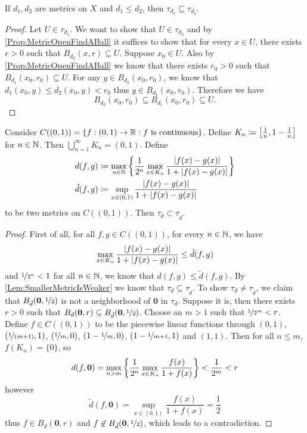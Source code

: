 \documentclass[screen]{techreport}
\numberwithin{equation}{section}
\begin{document}
\begin{lemma}\label{Lem:SmallerMetricIsWeaker}
	If $d_1,d_2$ are metrics on $X$ and $d_1 \le d_2$, then $\tau_{d_1} \subseteq \tau_{d_2}$.
\end{lemma}
\begin{proof}
	Let $U \in \tau_{d_1}$.
	We want to show that $U \in \tau_{d_2}$ and by \cref{Prop:MetricOpenFindABall} it suffices to show that for every $x \in U$, there exists $r >0$ such that $B_{d_2}(x,r) \subseteq U$.
	Suppose $x_0 \in U$.
	Also by \cref{Prop:MetricOpenFindABall} we know that there exists $r_0 > 0$ such that $B_{d_1}(x_0,r_0) \subseteq U$.
	For any $y \in B_{d_2}(x_0,r_0)$, we know that $d_1(x_0,y) \le d_2(x_0,y) < r_0$ thus $y \in B_{d_1}(x_0,r_0)$.
	Therefore we have
	\[
	B_{d_2}(x_0,r_0) \subseteq B_{d_1}(x_0,r_0) \subseteq U.
	\]
\end{proof}

\begin{proposition}\label{Prop:SmallerMetricIndeedWeaker}
	Consider $C((0,1)) = \{ f : (0,1) \to \mathbb{R} : f~\text{is continuous} \}$.
	Define $K_n \coloneqq \left[{\frac{1}{n}, 1-\frac{1}{n}}\right]$ for $n \in \mathbb{N}$.
	Then $\bigcup_{n=1}^\infty K_n = (0,1)$.
	Define
	\begin{align*}
		d(f,g) & \coloneqq \max_{n \in \mathbb{N}} \left\{ { \frac{1}{2^n} \max_{x \in K_n} \frac{\left|{f(x)-g(x)}\right|}{1+\left|{f(x)-g(x)}\right|} } \right\} \\
		\tilde{d}(f,g) & \coloneqq  \sup_{x \in (0,1)} \frac{\left|{f(x)-g(x)}\right|}{1+\left|{f(x)-g(x)}\right|}
	\end{align*}
	to be two metrics on $C((0,1))$.
	Then $\tau_d \subset \tau_{\tilde{d}}$.
\end{proposition}
\begin{proof}
	First of all, for all $f,g \in C((0,1))$, for every $n \in \mathbb{N}$, we have
	\[
	\max_{x \in K_n} \frac{\left|{f(x)-g(x)}\right|}{1+\left|{f(x)-g(x)}\right|} \le \tilde{d}(f,g)
	\]
	and $\nicefrac{1}{2^n} < 1$ for all $n \in \mathbb{N}$, we know that $d(f,g) \le \tilde{d}(f,g)$.
	By \cref{Lem:SmallerMetricIsWeaker} we know that $\tau_d \subseteq \tau_{\tilde{d}}$.
	To show $\tau_d \neq \tau_{\tilde{d}}$, we claim that $B_{\tilde{d}}(\mathbf{0},\nicefrac{1}{2})$ is not a neighborhood of $\mathbf{0}$ in $\tau_d$.
	Suppose it is, then there exists $r > 0$ such that $B_d(\mathbf{0},r) \subseteq B_{\tilde{d}}(\mathbf{0},\nicefrac{1}{2})$.
	Choose an $m >1$ such that $\nicefrac{1}{2^m} < r$.
	Define $f \in C((0,1))$ to be the piecewise linear functions through $(0,1)$, $(\nicefrac{1}{(m+1)},1)$, $(\nicefrac{1}{m},0)$, $(1-\nicefrac{1}{m},0)$, $(1-\nicefrac{1}{m+1},1)$ and $(1,1)$.
	Then for all $n \le m$, $f(K_n) = \{0\}$, so
	\[
	d(f,\mathbf{0})  = \max_{n > m} \left\{ { \frac{1}{2^n} \max_{x \in K_n} \frac{f(x)}{1+f(x)}  } \right\} < \frac{1}{2^m} < r
	\]
	however
	\[
	\tilde{d}(f,\mathbf{0}) = \sup_{x \in (0,1)} \frac{f(x)}{1+f(x)} = \frac{1}{2}
	\]
	thus $f \in B_d(\mathbf{0},r)$ and $f \not\in B_{\tilde{d}}(\mathbf{0}, \nicefrac{1}{2})$, which leads to a contradiction.
\end{proof}
\end{document}
